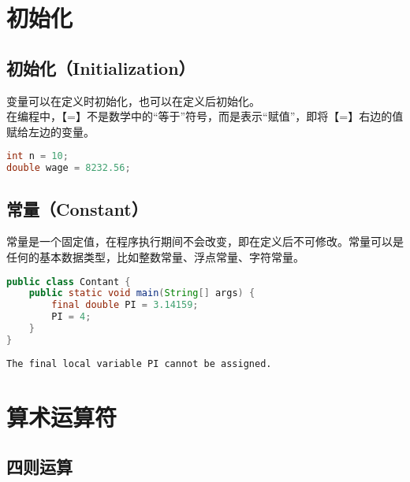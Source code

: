 \newpage

\section{初始化}

\subsection{初始化（Initialization）}

变量可以在定义时初始化，也可以在定义后初始化。\\

在编程中，【=】不是数学中的“等于”符号，而是表示“赋值”，即将【=】右边的值赋给左边的变量。

\vspace{-0.5cm}

\begin{lstlisting}[language=Java]
int n = 10;
double wage = 8232.56;
\end{lstlisting}

\vspace{0.5cm}

\subsection{常量（Constant）}

常量是一个固定值，在程序执行期间不会改变，即在定义后不可修改。常量可以是任何的基本数据类型，比如整数常量、浮点常量、字符常量。\\


\begin{lstlisting}[language=Java]
public class Contant {
    public static void main(String[] args) {
        final double PI = 3.14159;
        PI = 4;
    }
}
\end{lstlisting}

\begin{tcolorbox}
	\begin{verbatim}
The final local variable PI cannot be assigned.
	\end{verbatim}
\end{tcolorbox}

\section{算术运算符}

\subsection{四则运算}

